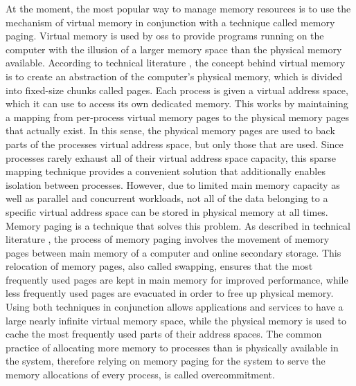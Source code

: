At the moment, the most popular way to manage memory resources is to use the mechanism of virtual memory in conjunction with a technique called memory paging.
Virtual memory is used by \acp{os} to provide programs running on the computer with the illusion of a larger memory space than the physical memory available.
According to technical literature \cite{mos2009}, the concept behind virtual memory is to create an abstraction of the computer's physical memory, which is divided into fixed-size chunks called pages.
Each process is given a virtual address space, which it can use to access its own dedicated memory.
This works by maintaining a mapping from per-process virtual memory pages to the physical memory pages that actually exist.
In this sense, the physical memory pages are used to back parts of the processes virtual address space, but only those that are used.
Since processes rarely exhaust all of their virtual address space capacity, this sparse mapping technique provides a convenient solution that additionally enables isolation between processes.
However, due to limited main memory capacity as well as parallel and concurrent workloads, not all of the data belonging to a specific virtual address space can be stored in physical memory at all times.
Memory paging is a technique that solves this problem.
As described in technical literature \cite{mos2009}, the process of memory paging involves the movement of memory pages between main memory of a computer and online secondary storage.
This relocation of memory pages, also called swapping, ensures that the most frequently used pages are kept in main memory for improved performance, while less frequently used pages are evacuated in order to free up physical memory.
Using both techniques in conjunction allows applications and services to have a large nearly infinite virtual memory space, while the physical memory is used to cache the most frequently used parts of their address spaces.
The common practice of allocating more memory to processes than is physically available in the system, therefore relying on memory paging for the system to serve the memory allocations of every process, is called overcommitment.

